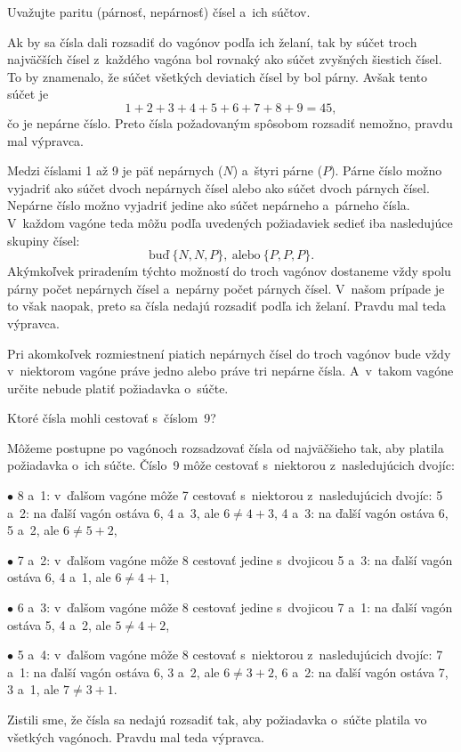 {%
\napad
Uvažujte paritu (párnosť, nepárnosť) čísel a~ich súčtov.

\riesenie
Ak by sa čísla dali rozsadiť do vagónov podľa ich želaní, tak by súčet troch najväčších čísel z~každého vagóna bol rovnaký ako súčet zvyšných šiestich čísel.
To by znamenalo, že súčet všetkých deviatich čísel by bol párny.
Avšak tento súčet je
$$
1+2+3+4+5+6+7+8+9=45,
$$
čo je nepárne číslo.
Preto čísla požadovaným spôsobom rozsadiť nemožno, pravdu mal výpravca.

\ineriesenie
Medzi číslami 1 až 9 je päť nepárnych ($N$) a~štyri párne ($P$).
Párne číslo možno vyjadriť ako súčet dvoch nepárnych čísel alebo ako súčet dvoch párnych čísel.
Nepárne číslo možno vyjadriť jedine ako súčet nepárneho a~párneho čísla.
V~každom vagóne teda môžu podľa uvedených požiadaviek sedieť iba nasledujúce skupiny čísel:
$$
\text{buď}\ \{N, N, P\},\ \text{alebo}\ \{P, P, P\}.
$$
Akýmkoľvek priradením týchto možností do troch vagónov dostaneme vždy spolu párny počet nepárnych čísel a~nepárny počet párnych čísel.
V~našom prípade je to však naopak, preto sa čísla nedajú rozsadiť podľa ich želaní.
Pravdu mal teda výpravca.

\poznamka
Pri akomkoľvek rozmiestnení piatich nepárnych čísel do troch vagónov bude vždy v~niektorom vagóne práve jedno alebo práve tri nepárne čísla.
A~v~takom vagóne určite nebude platiť požiadavka o~súčte.

\napadd
Ktoré čísla mohli cestovať s~číslom~9?

\ineriesenie
Môžeme postupne po vagónoch rozsadzovať čísla od najväčšieho tak, aby platila požiadavka o~ich súčte.
Číslo~9 môže cestovať s~niektorou z~nasledujúcich dvojíc:
\item{$\bullet$}
8 a~1: v~ďalšom vagóne môže 7 cestovať s~niektorou z~nasledujúcich dvojíc:
\itemitem{$\triangleright$} 5 a~2: na ďalší vagón ostáva 6, 4 a~3, ale $6\ne 4+3$,
\itemitem{$\triangleright$} 4 a~3: na ďalší vagón ostáva 6, 5 a~2, ale $6\ne 5+2$,
\smallskip
\item{$\bullet$}
7 a~2: v~ďalšom vagóne môže 8 cestovať jedine s~dvojicou
\itemitem{$\triangleright$} 5 a~3: na ďalší vagón ostáva 6, 4 a~1, ale $6\ne 4+1$,
\smallskip
\item{$\bullet$}
6 a~3: v~ďalšom vagóne môže 8 cestovať jedine s~dvojicou
\itemitem{$\triangleright$} 7 a~1: na ďalší vagón ostáva 5, 4 a~2, ale $5\ne 4+2$,
\smallskip
\item{$\bullet$}
5 a~4: v~ďalšom vagóne môže 8 cestovať s~niektorou z~nasledujúcich dvojíc:
\itemitem{$\triangleright$} 7 a~1: na ďalší vagón ostáva 6, 3 a~2, ale $6\ne 3+2$,
\itemitem{$\triangleright$} 6 a~2: na ďalší vagón ostáva 7, 3 a~1, ale $7\ne 3+1$.
\smallskip

Zistili sme, že čísla sa nedajú rozsadiť tak, aby požiadavka o~súčte platila vo všetkých vagónoch.
Pravdu mal teda výpravca.
}


